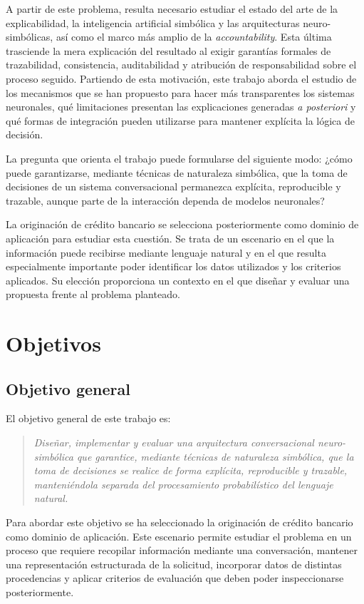 \documentclass[12pt,a4paper]{report}
\begin{document}
A partir de este problema, resulta necesario estudiar el estado del arte de la explicabilidad, la inteligencia artificial simbólica y las arquitecturas neuro-simbólicas, así como el marco más amplio de la \textit{accountability}. Esta última trasciende la mera explicación del resultado al exigir garantías formales de trazabilidad, consistencia, auditabilidad y atribución de responsabilidad sobre el proceso seguido. Partiendo de esta motivación, este trabajo aborda el estudio de los mecanismos que se han propuesto para hacer más transparentes los sistemas neuronales, qué limitaciones presentan las explicaciones generadas \textit{a posteriori} y qué formas de integración pueden utilizarse para mantener explícita la lógica de decisión.

La pregunta que orienta el trabajo puede formularse del siguiente modo: ¿cómo puede garantizarse, mediante técnicas de naturaleza simbólica, que la toma de decisiones de un sistema conversacional permanezca explícita, reproducible y trazable, aunque parte de la interacción dependa de modelos neuronales?

La originación de crédito bancario se selecciona posteriormente como dominio de aplicación para estudiar esta cuestión. Se trata de un escenario en el que la información puede recibirse mediante lenguaje natural y en el que resulta especialmente importante poder identificar los datos utilizados y los criterios aplicados. Su elección proporciona un contexto en el que diseñar y evaluar una propuesta frente al problema planteado.

\section{Objetivos}

\subsection{Objetivo general}

El objetivo general de este trabajo es:

\begin{quote}
\textit{Diseñar, implementar y evaluar una arquitectura conversacional neuro-simbólica que garantice, mediante técnicas de naturaleza simbólica, que la toma de decisiones se realice de forma explícita, reproducible y trazable, manteniéndola separada del procesamiento probabilístico del lenguaje natural.}
\end{quote}

Para abordar este objetivo se ha seleccionado la originación de crédito bancario como dominio de aplicación. Este escenario permite estudiar el problema en un proceso que requiere recopilar información mediante una conversación, mantener una representación estructurada de la solicitud, incorporar datos de distintas procedencias y aplicar criterios de evaluación que deben poder inspeccionarse posteriormente.
\end{document}
